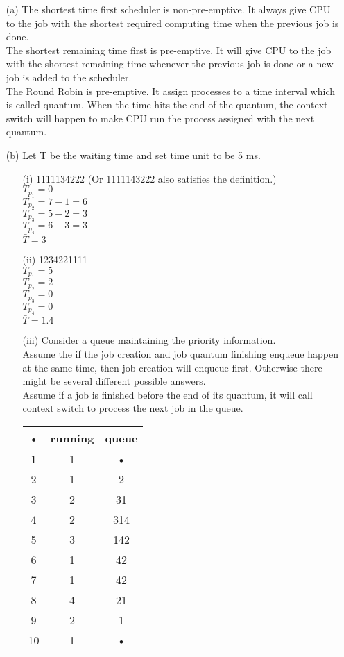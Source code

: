 \documentclass[10pt,twoside,a4paper]{article}
\begin{document}
\begin{itemize}
\item[(a)]
The shortest time first scheduler is non-pre-emptive. It always give CPU to the job with the shortest required computing time when the previous job is done.
\\The shortest remaining time first is pre-emptive. It will give CPU to the job with the shortest remaining time whenever the previous job is done or a new job is added to the scheduler.
\\The Round Robin is pre-emptive. It assign processes to a time interval which is called quantum. When the time hits the end of the quantum, the context switch will happen to make CPU run the process assigned with the next quantum.
\item[(b)]
Let T be the waiting time and set time unit to be 5 ms.
\begin{itemize}
\item[(i)]
1111134222 (Or 1111143222 also satisfies the definition.)
\\$T_{p_1}=0$
\\$T_{p_2}=7-1=6$
\\$T_{p_3}=5-2=3$
\\$T_{p_4}=6-3=3$
\\$\bar{T}=3$
\item[(ii)]
1234221111
\\$T_{p_1}=5$
\\$T_{p_2}=2$
\\$T_{p_3}=0$
\\$T_{p_4}=0$
\\$\bar{T}=1.4$
\item[(iii)]
Consider a queue maintaining the priority information.
\\Assume the if the job creation and job quantum finishing enqueue happen at the same time, then job creation will enqueue first. Otherwise there might be several different possible answers.
\\Assume if a job is finished before the end of its quantum, it will call context switch to process the next job in the queue.

\begin{tabular}{|c|c|c|}
\hline 
• & running & queue \\ 
\hline 
1 & 1 & • \\ 
\hline 
2 & 1 & 2 \\ 
\hline 
3 & 2 & 31 \\ 
\hline 
4 & 2 & 314 \\ 
\hline 
5 & 3 & 142 \\ 
\hline 
6 & 1 & 42 \\ 
\hline 
7 & 1 & 42 \\ 
\hline 
8 & 4 & 21 \\ 
\hline 
9 & 2 & 1 \\ 
\hline 
10 & 1 & • \\ 
\hline 
\end{tabular} 


\end{itemize}
\end{itemize}
\end{document}

